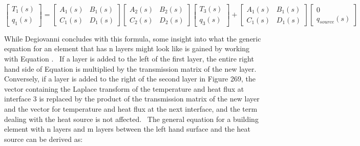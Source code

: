 \begin{equation}
\left[ {\begin{array}{*{20}{c}}{{T_1}\left( s \right)}\\ {{q_1}\left( s \right)}\end{array}} \right] = \left[ {\begin{array}{*{20}{c}}{{A_1}\left( s \right)}&{{B_1}\left( s \right)}\\ {{C_1}\left( s \right)}&{{D_1}\left( s \right)}\end{array}} \right]\left[ {\begin{array}{*{20}{c}}{{A_2}\left( s \right)}&{{B_2}\left( s \right)}\\ {{C_2}\left( s \right)}&{{D_2}\left( s \right)}\end{array}} \right]\left[ {\begin{array}{*{20}{c}}{{T_3}\left( s \right)}\\ {{q_3}\left( s \right)}\end{array}} \right] + \left[ {\begin{array}{*{20}{c}}{{A_1}\left( s \right)}&{{B_1}\left( s \right)}\\ {{C_1}\left( s \right)}&{{D_1}\left( s \right)}\end{array}} \right]\left[ {\begin{array}{*{20}{c}}0\\ {{q_{source}}\left( s \right)}\end{array}} \right]
\end{equation}

While Degiovanni concludes with this formula, some insight into what the generic equation for an element that has n layers might look like is gained by working with Equation .~ If a layer is added to the left of the first layer, the entire right hand side of Equation is multiplied by the transmission matrix of the new layer.~ Conversely, if a layer is added to the right of the second layer in Figure 269, the vector containing the Laplace transform of the temperature and heat flux at interface 3 is replaced by the product of the transmission matrix of the new layer and the vector for temperature and heat flux at the next interface, and the term dealing with the heat source is not affected.~ The general equation for a building element with n layers and m layers between the left hand surface and the heat source can be derived as:

